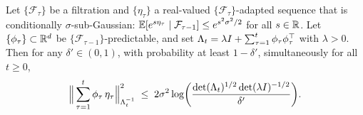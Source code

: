 \begin{lemma}\label{lem:self-normalized}
Let $\{\mathcal F_\tau\}$ be a filtration and $\{\eta_\tau\}$ a real-valued
$\{\mathcal F_\tau\}$-adapted sequence that is conditionally $\sigma$-sub-Gaussian:
$\mathbb{E}[e^{s\eta_\tau}\mid\mathcal F_{\tau-1}]\le e^{s^2\sigma^2/2}$ for all $s\in\mathbb{R}$.
Let $\{\phi_\tau\}\subset\mathbb{R}^d$ be $\{\mathcal F_{\tau-1}\}$-predictable, and
set $\Lambda_t=\lambda I+\sum_{\tau=1}^t\phi_\tau\phi_\tau^\top$ with
$\lambda>0$. Then for any $\delta'\in(0,1)$, with probability at least
$1-\delta'$, simultaneously for all $t\ge0$,
\begin{align*}
\Big\| \sum_{\tau=1}^t \phi_\tau\,\eta_\tau \Big\|_{\Lambda_t^{-1}}^2
\;\le\; 2\sigma^2\log\!\bigg( \frac{\det(\Lambda_t)^{1/2}\det(\lambda I)^{-1/2}}{\delta'} \bigg).
\end{align*}
\end{lemma}
